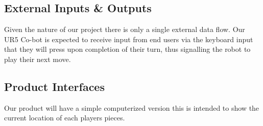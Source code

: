 \subsection{External Inputs \& Outputs}
Given the nature of our project there is only a single external data flow. Our UR5 Co-bot is expected to receive input from end users via the keyboard input that they will press upon completion of their turn, thus signalling the robot to play their next move.

\subsection{Product Interfaces}

Our product will have a simple computerized version this is intended to show the current location of each players pieces.